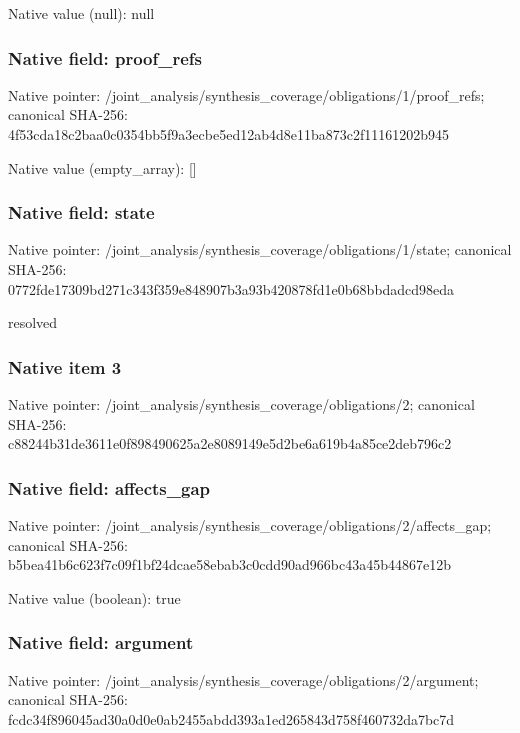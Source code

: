 \documentclass[10pt,a4paper]{article}
\begin{document}
Native value (null): null

\subsubsection{Native field: proof\_\allowbreak{}refs}
Native pointer: /joint\_\allowbreak{}analysis/synthesis\_\allowbreak{}coverage/obligations/1/proof\_\allowbreak{}refs; canonical SHA-256: 4f53cda18c2baa0c0354bb5f9a3ecbe5ed12ab4d8e11ba873c2f11161202b945

Native value (empty\_\allowbreak{}array): []

\subsubsection{Native field: state}
Native pointer: /joint\_\allowbreak{}analysis/synthesis\_\allowbreak{}coverage/obligations/1/state; canonical SHA-256: 0772fde17309bd271c343f359e848907b3a93b420878fd1e0b68bbdadcd98eda

\begingroup\raggedright\sloppy resolved\par\endgroup

\subsubsection{Native item 3}
Native pointer: /joint\_\allowbreak{}analysis/synthesis\_\allowbreak{}coverage/obligations/2; canonical SHA-256: c88244b31de3611e0f898490625a2e8089149e5d2be6a619b4a85ce2deb796c2

\subsubsection{Native field: affects\_\allowbreak{}gap}
Native pointer: /joint\_\allowbreak{}analysis/synthesis\_\allowbreak{}coverage/obligations/2/affects\_\allowbreak{}gap; canonical SHA-256: b5bea41b6c623f7c09f1bf24dcae58ebab3c0cdd90ad966bc43a45b44867e12b

Native value (boolean): true

\subsubsection{Native field: argument}
Native pointer: /joint\_\allowbreak{}analysis/synthesis\_\allowbreak{}coverage/obligations/2/argument; canonical SHA-256: fcdc34f896045ad30a0d0e0ab2455abdd393a1ed265843d758f460732da7bc7d
\end{document}
